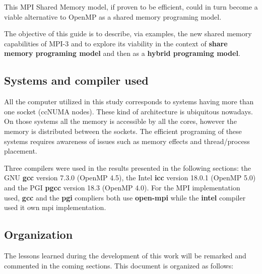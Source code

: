 \medskip

This MPI Shared Memory model, if proven to be efficient, could in turn become a viable alternative to OpenMP as a shared memory programing model.
 
\medskip


The objective of this guide is to describe, via examples, the new shared memory capabilities of MPI-3 and to explore its viability in the context of \textbf{share memory programing model} and then as a \textbf{hybrid programing model}.


\subsection*{Systems and compiler used}

All the computer utilized in this study corresponds to systems having more than one socket (ccNUMA nodes). These kind of architecture is ubiquitous nowadays. On those systems all the memory is accessible by all the cores, however the memory is distributed between the sockets. The efficient programing of these systems requires awareness of issues such as memory effects and thread/process placement.


Three compilers were used in the results presented in the following sections: the GNU \textbf{gcc}  version 7.3.0 (OpenMP 4.5), the Intel \textbf{icc} version 18.0.1 (OpenMP 5.0) and the  PGI \textbf{pgcc} version 18.3 (OpenMP 4.0). For the MPI implementation used, \textbf{gcc} and the \textbf{pgi} compliers both use \textbf{open-mpi} while the \textbf{intel} compiler used it own mpi implementation.



\subsection*{Organization}


\medskip

The lessons learned during the development of this work will be remarked and commented in the coming sections. This document is organized as follows:

